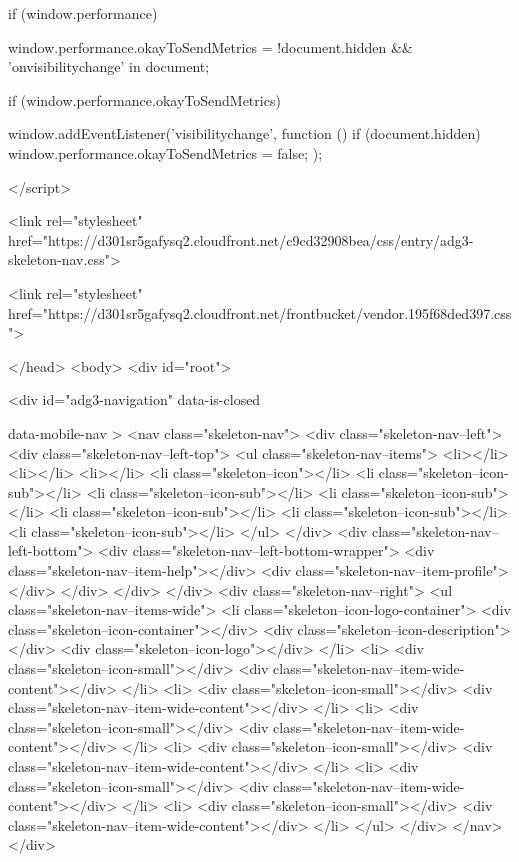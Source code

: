 if (window.performance) {

  
  window.performance.okayToSendMetrics = !document.hidden && 'onvisibilitychange' in document;

  if (window.performance.okayToSendMetrics) {

    
    window.addEventListener('visibilitychange', function () {
      if (document.hidden) {
        window.performance.okayToSendMetrics = false;
      }
    });
  }
}
</script>
    
    <link rel="stylesheet" href="https://d301sr5gafysq2.cloudfront.net/c9cd32908bea/css/entry/adg3-skeleton-nav.css">
    
    
      
        <link rel="stylesheet" href="https://d301sr5gafysq2.cloudfront.net/frontbucket/vendor.195f68ded397.css">
      
      
    
    
  </head>
  <body>
    <div id="root">
      
        <div id="adg3-navigation"
   data-is-closed
  
  
   data-mobile-nav
  >
  <nav class="skeleton-nav">
    <div class="skeleton-nav--left">
      <div class="skeleton-nav--left-top">
        <ul class="skeleton-nav--items">
          <li></li>
          <li></li>
          <li></li>
          <li class="skeleton--icon"></li>
          <li class="skeleton--icon-sub"></li>
          <li class="skeleton--icon-sub"></li>
          <li class="skeleton--icon-sub"></li>
          <li class="skeleton--icon-sub"></li>
          <li class="skeleton--icon-sub"></li>
          <li class="skeleton--icon-sub"></li>
        </ul>
      </div>
      <div class="skeleton-nav--left-bottom">
        <div class="skeleton-nav--left-bottom-wrapper">
          <div class="skeleton-nav--item-help"></div>
          <div class="skeleton-nav--item-profile"></div>
        </div>
      </div>
    </div>
    <div class="skeleton-nav--right">
      <ul class="skeleton-nav--items-wide">
        <li class="skeleton--icon-logo-container">
          <div class="skeleton--icon-container"></div>
          <div class="skeleton--icon-description"></div>
          <div class="skeleton--icon-logo"></div>
        </li>
        <li>
          <div class="skeleton--icon-small"></div>
          <div class="skeleton-nav--item-wide-content"></div>
        </li>
        <li>
          <div class="skeleton--icon-small"></div>
          <div class="skeleton-nav--item-wide-content"></div>
        </li>
        <li>
          <div class="skeleton--icon-small"></div>
          <div class="skeleton-nav--item-wide-content"></div>
        </li>
        <li>
          <div class="skeleton--icon-small"></div>
          <div class="skeleton-nav--item-wide-content"></div>
        </li>
        <li>
          <div class="skeleton--icon-small"></div>
          <div class="skeleton-nav--item-wide-content"></div>
        </li>
        <li>
          <div class="skeleton--icon-small"></div>
          <div class="skeleton-nav--item-wide-content"></div>
        </li>
      </ul>
    </div>
  </nav>
</div>
      
